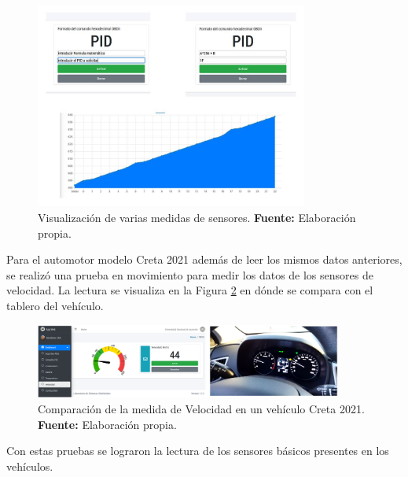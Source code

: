 \begin{figure}[H]
	\centering
	\includegraphics[width=0.8\textwidth]{./Cap6imagen/grafica_fig_c6.jpg}
	\caption [Visualización de varias medidas de sensores.]{Visualización de varias medidas de sensores.  \textbf{ Fuente:} %
		Elaboración propia.}
	\label{grafica_ref_c6} %
\end{figure}

Para el automotor modelo Creta 2021 además de leer los mismos datos anteriores, se realizó una prueba en movimiento para medir los datos de los sensores de velocidad. 
La lectura se visualiza en la Figura \ref{vel_ref_c6} en dónde se compara con el tablero del vehículo.

\begin{figure}[H]
	\centering
	\includegraphics[width=0.9\textwidth]{./Cap6imagen/vel_fig_c6.png}
	\caption [Comparación de la medida de Velocidad en un vehículo Creta 2021.]{Comparación de la medida de Velocidad en un vehículo Creta 2021.  \textbf{ Fuente:} %
		Elaboración propia.}
	\label{vel_ref_c6} %
\end{figure}

Con estas pruebas se lograron la lectura de los sensores básicos presentes en los vehículos. 